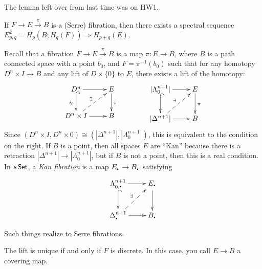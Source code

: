 
The lemma left over from last time was on HW1. \anton{}

\begin{theorem}
 If $F\to E\xrightarrow\pi B$ is a (Serre) fibration, then there exists a spectral sequence $E^2_{p,q}= H_p(B;H_q(F))\Rightarrow H_{p+q}(E)$.
\end{theorem}
Recall that a fibration $F\to E\xrightarrow \pi B$ is a map $\pi\colon E\to B$, where $B$ is a path connected space with a point $b_0$, and $F=\pi^{-1}(b_0)$ such that for any homotopy $D^n\times I\to B$ and any lift of $D\times\{0\}$ to $E$, there exists a lift of the homotopy:
\[\xymatrix{
 D^n \ar[r]\ar@{^(->}[d]_{i_0} & E\ar[d]^\pi\\
 D^n\times I \ar[r] \ar@{-->}[ur]^{\exists} & B
} \qquad\qquad
\xymatrix{
 |\Lambda^{n+1}_0| \ar@{^(->}[d] \ar[r] & E\ar[d]^\pi\\
 |\Delta^{n+1}| \ar[r] \ar@{-->}[ur]^\exists & B
}\]
Since $(D^n\times I,D^n\times 0)\cong (|\Delta^{n+1}|,|\Lambda^{n+1}_0|)$, this is equivalent to the condition on the right. If $B$ is a point, then all spaces $E$ are ``Kan'' because there is a retraction $|\Delta^{n+1}|\to |\Lambda^{n+1}_0|$, but if $B$ is not a point, then this is a real condition. In $s\operatorname{\sf Set}$, a \emph{Kan fibration} is a map $E_\udot\to B_\udot$ satisfying
\[\xymatrix{
 \Lambda^{n+1}_{0,\udot} \ar@{^(->}[d] \ar[r] & E_\udot\ar[d]\\
 \Delta^{n+1}_\udot \ar[r] \ar@{-->}[ur]^\exists & B_\udot
}\]
Such things realize to Serre fibrations.
\begin{remark}
 The lift is unique if and only if $F$ is discrete. In this case, you call $E\to B$ a covering map.
\end{remark}


